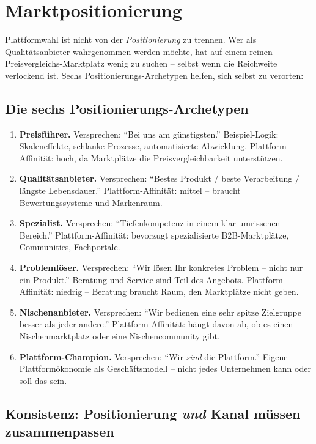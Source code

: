\documentclass[11pt,a4paper,oneside]{article}
\begin{document}
\section{Marktpositionierung}

Plattformwahl ist nicht von der \emph{Positionierung} zu trennen. Wer als Qualitätsanbieter wahrgenommen werden möchte, hat auf einem reinen Preisvergleichs-Marktplatz wenig zu suchen -- selbst wenn die Reichweite verlockend ist. Sechs Positionierungs-Archetypen helfen, sich selbst zu verorten:

\subsection{Die sechs Positionierungs-Archetypen}

\begin{enumerate}
  \item \textbf{Preisführer.} Versprechen: ``Bei uns am günstigsten.'' Beispiel-Logik: Skaleneffekte, schlanke Prozesse, automatisierte Abwicklung. Plattform-Affinität: hoch, da Marktplätze die Preisvergleichbarkeit unterstützen.
  \item \textbf{Qualitätsanbieter.} Versprechen: ``Bestes Produkt / beste Verarbeitung / längste Lebensdauer.'' Plattform-Affinität: mittel -- braucht Bewertungssysteme und Markenraum.
  \item \textbf{Spezialist.} Versprechen: ``Tiefenkompetenz in einem klar umrissenen Bereich.'' Plattform-Affinität: bevorzugt spezialisierte B2B-Marktplätze, Communities, Fachportale.
  \item \textbf{Problemlöser.} Versprechen: ``Wir lösen Ihr konkretes Problem -- nicht nur ein Produkt.'' Beratung und Service sind Teil des Angebots. Plattform-Affinität: niedrig -- Beratung braucht Raum, den Marktplätze nicht geben.
  \item \textbf{Nischenanbieter.} Versprechen: ``Wir bedienen eine sehr spitze Zielgruppe besser als jeder andere.'' Plattform-Affinität: hängt davon ab, ob es einen Nischenmarktplatz oder eine Nischencommunity gibt.
  \item \textbf{Plattform-Champion.} Versprechen: ``Wir \emph{sind} die Plattform.'' Eigene Plattformökonomie als Geschäftsmodell -- nicht jedes Unternehmen kann oder soll das sein.
\end{enumerate}

\subsection{Konsistenz: Positionierung \emph{und} Kanal müssen zusammenpassen}
\end{document}
